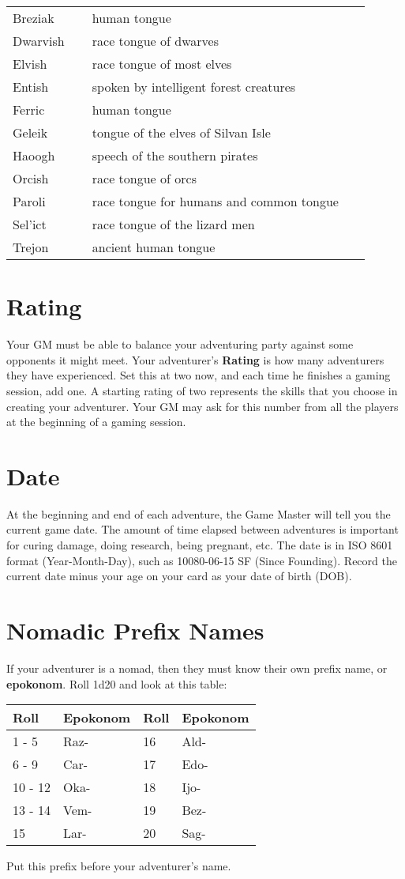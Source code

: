 \begin{multicols*}{2}
\begin{tabular}{@{}p{0.2\linewidth} p{0.7\linewidth}}
Breziak & human tongue\\
Dwarvish & race tongue of dwarves\\
Elvish & race tongue of most elves\\
Entish & spoken by intelligent forest creatures\\
Ferric & human tongue\\
Geleik & tongue of the elves of Silvan Isle\\
Haoogh & speech of the southern pirates\\
Orcish & race tongue of orcs\\
Paroli & race tongue for humans and common tongue\\
Sel’ict & race tongue of the lizard men\\
Trejon & ancient human tongue\\
\end{tabular}
\section{Rating}
Your GM must be able to balance your adventuring party against some opponents it might meet. Your adventurer's \textbf{Rating} is how many adventurers they have experienced. Set this at two now, and each time he finishes a gaming session, add one. A starting rating of two represents the skills that you choose in creating your adventurer. Your GM may ask for this number from all the players at the beginning of a gaming session.
\section{Date}
At the beginning and end of each adventure, the Game Master will tell you the current game date. The amount of time elapsed between adventures is important for curing damage, doing research, being pregnant, etc. The date is in ISO 8601 format (Year-Month-Day), such as 10080-06-15 SF (Since Founding). Record the current date minus your age on your card as your date of birth (DOB).
\section{Nomadic Prefix Names}
If your adventurer is a nomad, then they must know their own prefix name, or \textbf{epokonom}. Roll 1d20 and look at this table:
\begin{tcolorbox}[breakable,boxrule=0pt]
\begin{tabular}{l l|l l}
Roll & Epokonom & Roll & Epokonom\\
\midrule
1 - 5 & Raz- & 16 & Ald-\\
6 - 9 & Car- & 17 & Edo-\\
10 - 12 & Oka- & 18 & Ijo-\\
13 - 14 & Vem- & 19 & Bez-\\
15 & Lar- & 20 & Sag-\\
\end{tabular}
\end{tcolorbox}
Put this prefix before your adventurer’s name.

\end{multicols*}

